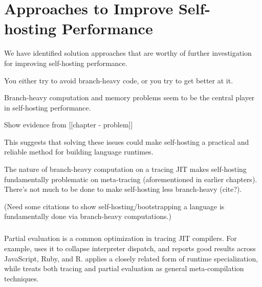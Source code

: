 \chapter{Approaches to Improve Self-hosting Performance}

	\label{chapter:solution}

    \begin{chaptersynopsis}
      We have identified solution approaches that are worthy of further investigation for improving self-hosting performance.

      You either try to avoid branch-heavy code, or you try to get better at it.
    \end{chaptersynopsis}

    \begin{paragraph-here}
      Branch-heavy computation and memory problems seem to be the central player in self-hosting performance.

      Show evidence from [[chapter - problem]]
    \end{paragraph-here}

    \begin{paragraph-here}
      This suggests that solving these issues could make self-hosting a practical and reliable method for building language runtimes.
    \end{paragraph-here}

    \begin{paragraph-here}
      The nature of branch-heavy computation on a tracing JIT makes self-hosting fundamentally problematic on meta-tracing (aforementioned in earlier chapters). There's not much to be done to make self-hosting less branch-heavy (cite?).

      (Need some citations to show self-hosting/bootstrapping a language is fundamentally done via branch-heavy computations.)
    \end{paragraph-here}

    \paragraph{}%
      Partial evaluation is a common optimization in tracing JIT compilers. For example, \cite{truffle-graal} uses it to collapse interpreter dispatch, and \cite{practical-partial} reports good results across JavaScript, Ruby, and R.  \cite{traceMonkey} applies a closely related form of runtime specialization, while \cite{trace-vs-PE} treats both tracing and partial evaluation as general meta-compilation techniques.

